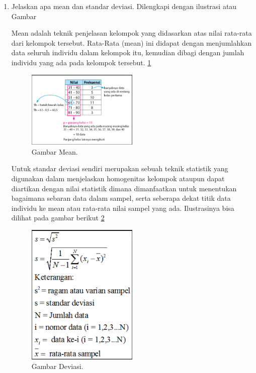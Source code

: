 \begin{enumerate}
\item Jelaskan apa mean dan standar deviasi. Dilengkapi dengan ilustrasi atau Gambar
\par Mean adalah teknik penjelasan kelompok yang didasarkan atas nilai rata-rata dari kelompok tersebut. Rata-Rata (mean) ini didapat dengan menjumlahkan data seluruh individu dalam kelompok itu, kemudian dibagi dengan jumlah individu yang ada pada kelompok tersebut. \ref{no5m}
\begin{figure}[ht]
\centerline{\includegraphics[width=0.5\textwidth]{figures/AFS/no5m.png}}
\caption{Gambar Mean.}
\label{no5m}
\end{figure}

\par Untuk standar deviasi sendiri merupakan sebuah teknik statistik yang digunakan dalam menjelaskan homogenitas kelompok ataupun dapat diartikan dengan nilai statistik dimana dimanfaatkan untuk menentukan bagaimana sebaran data dalam sampel, serta seberapa dekat titik data individu ke mean atau rata-rata nilai sampel yang ada. Ilustrasinya bisa dilihat pada gambar berikut  \ref{no5d}
\begin{figure}[ht]
\centerline{\includegraphics[width=0.5\textwidth]{figures/AFS/no5d.png}}
\caption{Gambar Deviasi.}
\label{no5d}
\end{figure}


\end{enumerate}
